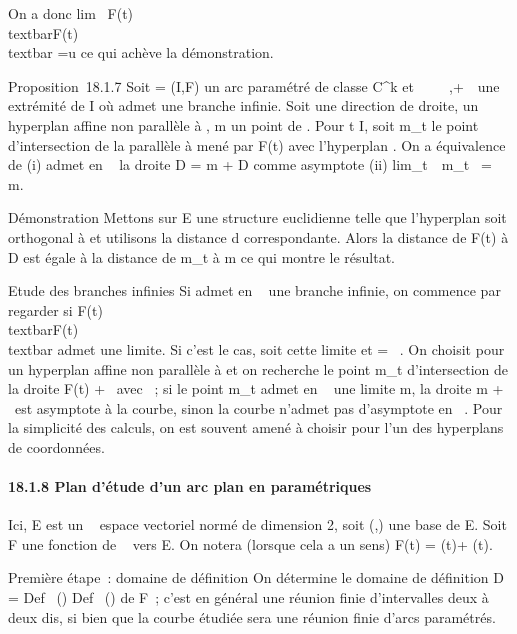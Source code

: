 \documentclass[]{article}
\begin{document}
On a donc lim~ F(t) \over
\\textbar{}F(t)\\textbar{}
=\vec u ce qui achève la démonstration.

Proposition~18.1.7 Soit \Gamma = (I,F) un arc paramétré de classe
C^k et \alpha~ \in {}~ \cup\-\infty~,+\infty~\ une
extrémité de I où \Gamma admet une branche infinie. Soit
\vecD une direction de droite, \Pi un hyperplan affine
non parallèle à \vecD, m un point de \Pi. Pour t \in I,
soit m\_t le point d'intersection de la parallèle à
\vecD mené par F(t) avec l'hyperplan \Pi. On a
équivalence de (i) \Gamma admet en \alpha~ la droite D = m +\vec
D comme asymptote (ii)
lim\_t\rightarrow~\alpha~m\_t~ = m.

Démonstration Mettons sur E une structure euclidienne telle que
l'hyperplan \Pi soit orthogonal à \vecD et utilisons la
distance d correspondante. Alors la distance de F(t) à D est égale à la
distance de m\_t à m ce qui montre le résultat.

Etude des branches infinies Si \Gamma admet en \alpha~ une branche infinie, on
commence par regarder si  F(t) \over
\\textbar{}F(t)\\textbar{} admet une
limite. Si c'est le cas, soit \vecu cette limite et
\vecD = ~\vecu. On choisit pour \Pi
un hyperplan affine non parallèle à \vecD et on
recherche le point m\_t d'intersection de la droite F(t) +
~\vecu avec \Pi~; si le point m\_t admet en \alpha~
une limite m, la droite m + ~\vecu est asymptote à la
courbe, sinon la courbe n'admet pas d'asymptote en \alpha~. Pour la simplicité
des calculs, on est souvent amené à choisir pour \Pi l'un des hyperplans
de coordonnées.

\paragraph{18.1.8 Plan d'étude d'un arc plan en paramétriques}

Ici, E est un ~ espace vectoriel normé de dimension 2, soit
(\vec\imath,) une base de E. Soit
F une fonction de ~ vers E. On notera (lorsque cela a un sens) F(t) =
\phi(t)\vec\imath + \psi(t).

Première étape~: domaine de définition On détermine le domaine de
définition D = Def~ (\phi)
\bigcap Def~ (\psi) de F~; c'est en général une réunion
finie d'intervalles deux à deux dis\jmathoints, si bien que la courbe étudiée
sera une réunion finie d'arcs paramétrés.
\end{document}
